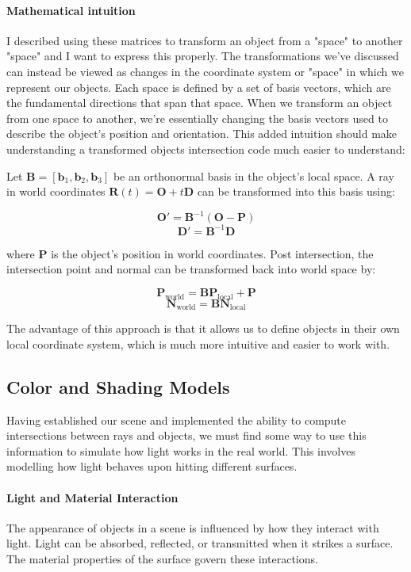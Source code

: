 \documentclass[12pt]{article}
\begin{document}
\paragraph{Mathematical intuition}
I described using these matrices to transform an object from a "space" to another "space" and I want to express this properly. The transformations we've discussed can instead be viewed as changes in the coordinate system or "space" in which we represent our objects. Each space is defined by a set of basis vectors, which are the fundamental directions that span that space. When we transform an object from one space to another, we're essentially changing the basis vectors used to describe the object's position and orientation. This added intuition should make understanding a transformed objects intersection code much easier to understand:

Let \(\mathbf{B} = [\mathbf{b}_1, \mathbf{b}_2, \mathbf{b}_3]\) be an orthonormal basis in the object's local space. A ray in world coordinates \(\mathbf{R}(t) = \mathbf{O} + t\mathbf{D}\) can be transformed into this basis using:

\[
    \mathbf{O}' = \mathbf{B}^{-1} (\mathbf{O} - \mathbf{P})
\]
\[
    \mathbf{D}' = \mathbf{B}^{-1} \mathbf{D}
\]

where \(\mathbf{P}\) is the object's position in world coordinates. Post intersection, the intersection point and normal can be transformed back into world space by:

\[
    \mathbf{P}_{\text{world}} = \mathbf{B} \mathbf{P}_{\text{local}} + \mathbf{P}
\]
\[
    \mathbf{N}_{\text{world}} = \mathbf{B} \mathbf{N}_{\text{local}}
\]

The advantage of this approach is that it allows us to define objects in their own local coordinate system, which is much more intuitive and easier to work with.

\subsection{Color and Shading Models}
\label{color_shading}
Having established our scene and implemented the ability to compute intersections between rays and objects, we must find some way to use this information to simulate how light works in the real world. This involves modelling how light behaves upon hitting different surfaces.

\paragraph{Light and Material Interaction}
The appearance of objects in a scene is influenced by how they interact with light. Light can be absorbed, reflected, or transmitted when it strikes a surface. The material properties of the surface govern these interactions.
\end{document}
